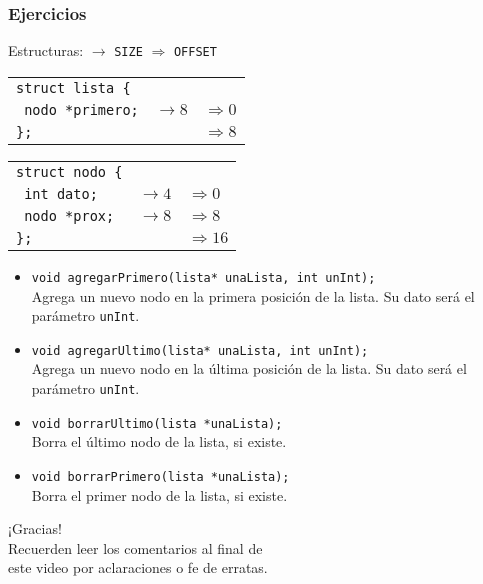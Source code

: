 \documentclass[aspectratio=169]{beamer}
\begin{document}
\begin{frame}[t]
    \frametitle{Ejercicios}
    \small
    Estructuras: \textcolor{verdeuca}{$\rightarrow$ \texttt{SIZE} $\Rightarrow$ \texttt{OFFSET}}
    \begin{multicols}{2}
    \begin{tabular}{lll}
    \texttt{struct lista \{}       &                                       & \\
    \texttt{      nodo *primero;}  & \textcolor{verdeuca}{$\rightarrow 8$} & \textcolor{verdeuca}{$\Rightarrow 0$}\\
    \texttt{\};}                   &                                       & \textcolor{verdeuca}{$\Rightarrow 8$}\\
    \end{tabular}
    \columnbreak
    \begin{tabular}{lll}
    \texttt{struct nodo \{}     &                                       & \\
    \texttt{      int dato;}    & \textcolor{verdeuca}{$\rightarrow 4$} & \textcolor{verdeuca}{$\Rightarrow 0$}\\
    \texttt{      nodo *prox;}  & \textcolor{verdeuca}{$\rightarrow 8$} & \textcolor{verdeuca}{$\Rightarrow 8$}\\
    \texttt{\};}                &                                       & \textcolor{verdeuca}{$\Rightarrow 16$}\\
    \end{tabular}
    \end{multicols}
    \begin{itemize}
    \item \texttt{void agregarPrimero(lista* unaLista, int unInt);}\\
        Agrega un nuevo nodo en la primera posición de la lista. Su dato será el parámetro \texttt{unInt}.
        \vspace{0.1cm}
    \item \texttt{void agregarUltimo(lista* unaLista, int unInt);}\\
        Agrega un nuevo nodo en la última posición de la lista. Su dato será el parámetro \texttt{unInt}.
        \vspace{0.1cm}
    \item \texttt{void borrarUltimo(lista *unaLista);}\\
        Borra el último nodo de la lista, si existe.
        \vspace{0.1cm}
    \item \texttt{void borrarPrimero(lista *unaLista);}\\
        Borra el primer nodo de la lista, si existe.
    \end{itemize}
\end{frame}

\begin{frame}[plain]
    \begin{center}
    \vspace{2cm}
    \huge ¡Gracias!\\
    \vspace{2cm}
    \normalsize Recuerden leer los comentarios al final de \\ este video por aclaraciones o fe de erratas.
    \end{center}
\end{frame}
\end{document}
